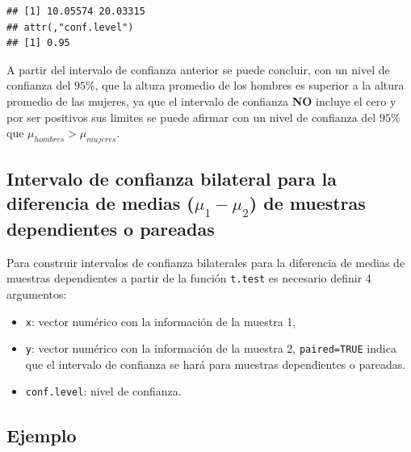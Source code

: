 \documentclass[
]{book}
\providecommand{\tightlist}{%
  \setlength{\itemsep}{0pt}\setlength{\parskip}{0pt}}
\begin{document}
\begin{verbatim}
## [1] 10.05574 20.03315
## attr(,"conf.level")
## [1] 0.95
\end{verbatim}

A partir del intervalo de confianza anterior se puede concluir, con un nivel de confianza del \(95\%\), que la altura promedio de los hombres es superior a la altura promedio de las mujeres, ya que el intervalo de confianza \textbf{NO} incluye el cero y por ser positivos sus limites se puede afirmar con un nivel de confianza del \(95\%\) que \(\mu_{hombres} > \mu_{mujeres}\).

\hypertarget{intervalo-de-confianza-bilateral-para-la-diferencia-de-medias-mu_1-mu_2-de-muestras-dependientes-o-pareadas}{%
\subsection{\texorpdfstring{Intervalo de confianza bilateral para la diferencia de medias (\(\mu_1-\mu_2\)) de muestras dependientes o pareadas}{Intervalo de confianza bilateral para la diferencia de medias (\textbackslash mu\_1-\textbackslash mu\_2) de muestras dependientes o pareadas}}\label{intervalo-de-confianza-bilateral-para-la-diferencia-de-medias-mu_1-mu_2-de-muestras-dependientes-o-pareadas}}

Para construir intervalos de confianza bilaterales para la diferencia de medias de muestras dependientes a partir de la función \texttt{t.test} es necesario definir 4 argumentos:

\begin{itemize}
\tightlist
\item
  \texttt{x}: vector numérico con la información de la muestra 1,
\item
  \texttt{y}: vector numérico con la información de la muestra 2,
  \texttt{paired=TRUE} indica que el intervalo de confianza se hará para muestras dependientes o pareadas.
\item
  \texttt{conf.level}: nivel de confianza.
\end{itemize}

\hypertarget{ejemplo-57}{%
\subsection*{Ejemplo}\label{ejemplo-57}}
\end{document}
